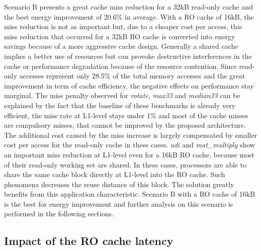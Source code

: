 \documentclass[sigconf]{acmart}
\begin{document}
Scenario B presents a great cache miss reduction for a 32kB read-only
cache and the best energy improvement of 20.6\% in average. With a RO
cache of 16kB, the miss reduction is not as important but, due to a
cheaper cost per access, this miss reduction that occurred for a 32kB
RO cache is converted into energy savings because of a more aggressive
cache design.
Generally a shared cache implies a better use of resources but
can provoke destructive interferences in the cache or performance
degradation because of the resource contention. Since read-only
accesses represent only 28.5\% of the total memory accesses and the
great improvement in term of cache efficiency, the negative effects on
performance stay marginal. The miss penalty observed for \textit{rotate},
\textit{max33} and \textit{median33} can be explained by the fact that
the baseline of these benchmarks is already very efficient, the miss
rate at L1-level stays under 1\% and most of the cache misses
are compulsory misses, that cannot be improved by the proposed architecture. The additional cost caused by the miss increase is
largely compensated by smaller cost per access for the read-only cache
in these cases. \textit{adi} and \textit{mat\_multiply} show an
important miss reduction at L1-level even for a 16kB RO cache, because
most of their read-only working set are shared. In these cases,
processors are able to share the same cache block directly at L1-level
into the RO cache. Such phenomena decreases the reuse distance of this
block. The solution greatly benefits from this
application characteristic. Scenario B with a RO cache of 16kB is
the best for energy improvement and further analysis on this scenario
is performed in the following sections.

\subsection{Impact of the RO cache latency}
\end{document}
